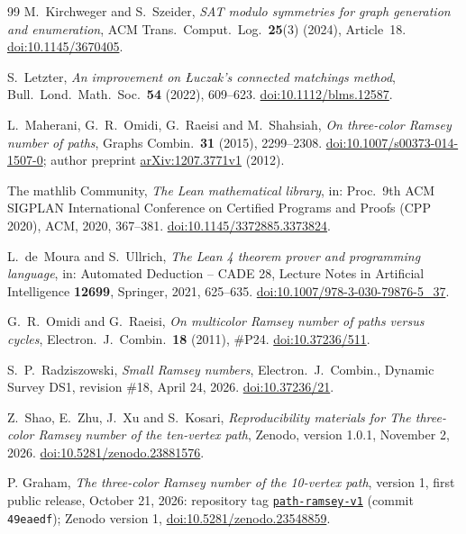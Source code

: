\documentclass[11pt]{article}
\theoremstyle{definition}
\theoremstyle{remark}
\begin{document}
\begin{thebibliography}{99}
M.~Kirchweger and S.~Szeider, \emph{SAT modulo symmetries for graph
generation and enumeration}, ACM Trans.\ Comput.\ Log.\ \textbf{25}(3)
(2024), Article~18.
\href{https://doi.org/10.1145/3670405}{doi:10.1145/3670405}.

S.~Letzter, \emph{An improvement on Łuczak's connected matchings method},
Bull.\ Lond.\ Math.\ Soc.\ \textbf{54} (2022), 609--623.
\href{https://doi.org/10.1112/blms.12587}{doi:10.1112/blms.12587}.

L.~Maherani, G.~R.~Omidi, G.~Raeisi and M.~Shahsiah, \emph{On three-color
Ramsey number of paths}, Graphs Combin.\ \textbf{31} (2015), 2299--2308.
\href{https://doi.org/10.1007/s00373-014-1507-0}{doi:10.1007/s00373-014-1507-0};
author preprint \href{https://arxiv.org/abs/1207.3771v1}{arXiv:1207.3771v1} (2012).

The mathlib Community, \emph{The Lean mathematical library}, in: Proc.\
9th ACM SIGPLAN International Conference on Certified Programs and Proofs
(CPP 2020), ACM, 2020, 367--381.
\href{https://doi.org/10.1145/3372885.3373824}{doi:10.1145/3372885.3373824}.

L.~de~Moura and S.~Ullrich, \emph{The Lean 4 theorem prover and
programming language}, in: Automated Deduction -- CADE 28, Lecture Notes
in Artificial Intelligence \textbf{12699}, Springer, 2021, 625--635.
\href{https://doi.org/10.1007/978-3-030-79876-5_37}{doi:10.1007/978-3-030-79876-5\_37}.

G.~R.~Omidi and G.~Raeisi, \emph{On multicolor Ramsey number of paths versus
cycles}, Electron.\ J.\ Combin.\ \textbf{18} (2011), \#P24.
\href{https://doi.org/10.37236/511}{doi:10.37236/511}.

S.~P.~Radziszowski, \emph{Small Ramsey numbers}, Electron.\ J.\ Combin.,
Dynamic Survey DS1, revision \#18, April 24, 2026.
\href{https://doi.org/10.37236/21}{doi:10.37236/21}.

Z.~Shao, E.~Zhu, J.~Xu and S.~Kosari, \emph{Reproducibility materials
for The three-color Ramsey number of the ten-vertex path}, Zenodo,
version 1.0.1, November 2, 2026.
\href{https://doi.org/10.5281/zenodo.23881576}{doi:10.5281/zenodo.23881576}.

P. Graham, \emph{The three-color Ramsey number of the 10-vertex path},
version 1, first public release, October 21, 2026: repository tag
\href{https://github.com/6/clank-lab/tree/path-ramsey-v1/results/path-ramsey}{\texttt{path-ramsey-v1}}
(commit \texttt{49eaedf});
Zenodo version 1, \href{https://doi.org/10.5281/zenodo.23548859}{doi:10.5281/zenodo.23548859}.


\end{thebibliography}
\end{document}
